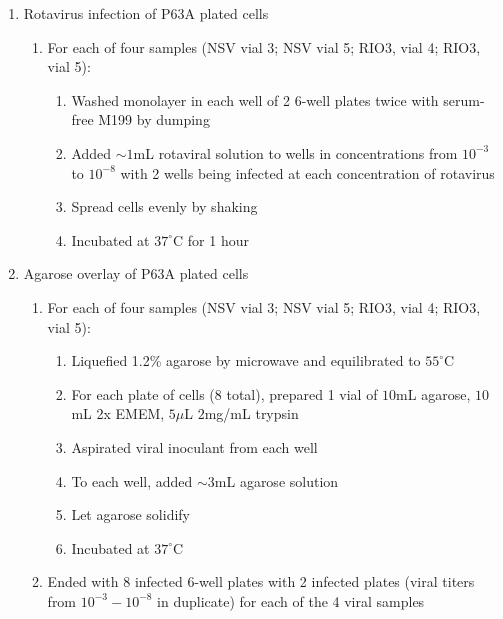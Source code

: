 \begin{enumerate}
	\item Rotavirus infection of P63A plated cells
		\begin{enumerate}
			\item For each of four samples (NSV vial 3; NSV vial 5; RIO3, vial 4; RIO3, vial 5):
				\begin{enumerate}
					\item Washed monolayer in each well of 2 6-well plates twice with serum-free M199 by dumping
					\item Added $\sim 1$mL rotaviral solution to wells in concentrations from $10^{-3}$ to $10^{-8}$ with 2 wells being infected at each concentration of rotavirus
					\item Spread cells evenly by shaking
					\item Incubated at $37^{\circ}$C for 1 hour
				\end{enumerate}
		\end{enumerate}
	\item Agarose overlay of P63A plated cells
		\begin{enumerate}
			\item For each of four samples (NSV vial 3; NSV vial 5; RIO3, vial 4; RIO3, vial 5):
				\begin{enumerate}
					\item Liquefied 1.2\% agarose by microwave and equilibrated to $55^{\circ}$C
					\item For each plate of cells (8 total), prepared 1 vial of $10$mL agarose, $10$mL 2x EMEM, $5\mu$L $2$mg/mL trypsin
					\item Aspirated viral inoculant from each well
					\item To each well, added $\sim3$mL agarose solution
					\item Let agarose solidify
					\item Incubated at $37^{\circ}$C
				\end{enumerate}
			\item Ended with 8 infected 6-well plates with 2 infected plates (viral titers from $10^{-3}-10^{-8}$ in duplicate) for each of the 4 viral samples
		\end{enumerate}
\end{enumerate}